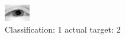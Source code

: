 \begin{figure}[h!]
\begin{center}
\includegraphics[width=0.60\columnwidth]{figures/ID2284_class_1_target_2.png}
\end{center}
\caption{ Classification: 1 actual target: 2}
\label{fig:ID2284_class_1_target_2}
\end{figure}
